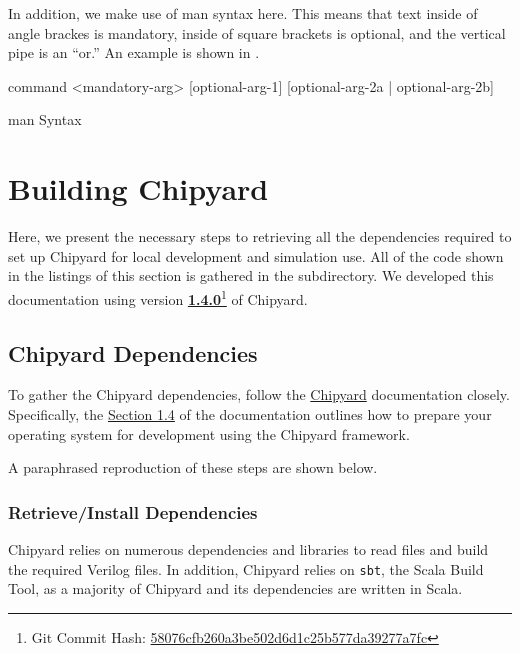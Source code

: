 In addition, we make use of \gls{man} syntax here.
This means that text inside of angle brackes is mandatory, inside of square brackets is optional, and the vertical pipe is an ``or.''
An example is shown in .

\begin{listing}[h!tbp]
\begin{bashsource}
command <mandatory-arg> [optional-arg-1] [optional-arg-2a | optional-arg-2b]
\end{bashsource}
\caption{\gls{man} Syntax}
\label{lst:man_Syntax}
\end{listing}

\section{Building Chipyard}\label{sec:Building_Chipyard}
Here, we present the necessary steps to retrieving all the dependencies required to set up Chipyard for local development and simulation use.
All of the code shown in the listings of this section is gathered in the  subdirectory.
We developed this documentation using version \href{https://github.com/ucb-bar/chipyard/releases/tag/1.4.0}{\textbf{1.4.0}}\footnote{Git Commit Hash: \href{https://github.com/ucb-bar/chipyard/commit/58076cfb260a3be502d6d1c25b577da39277a7fc}{58076cfb260a3be502d6d1c25b577da39277a7fc}} of Chipyard.

\subsection{Chipyard Dependencies}\label{sec:Chipyard_Dependencies}
To gather the Chipyard dependencies, follow the \href{https://chipyard.readthedocs.io/en/latest/}{Chipyard} documentation closely.
Specifically, the \href{https://chipyard.readthedocs.io/en/latest/Chipyard-Basics/Initial-Repo-Setup.html}{Section 1.4} of the documentation outlines how to prepare your operating system for development using the Chipyard framework.

A paraphrased reproduction of these steps are shown below.

\subsubsection{Retrieve/Install Dependencies}\label{sec:Retrive_Install_Dependencies}
Chipyard relies on numerous dependencies and libraries to read files and build the required Verilog files.
In addition, Chipyard relies on \texttt{sbt}, the Scala Build Tool, as a majority of Chipyard and its dependencies are written in Scala.

